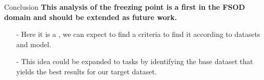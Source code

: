 \begin{subsectionframemod}{Conclusion}
\textbf{This analysis of the freezing point is a first in the FSOD domain and should be extended as future work.}

\begin{itemize}
    \item[-] Here it is a , we can expect to find a criteria to find it  according to datasets and model.
    \item[-] This idea could be expanded to  tasks by identifying the base dataset that yields the best results for our target dataset.
\end{itemize}

\end{subsectionframemod}